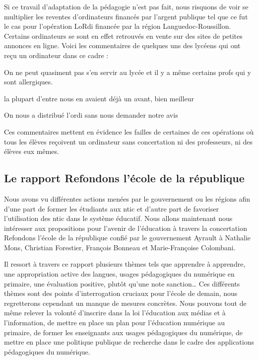 Si ce travail d'adaptation de la pédagogie n'est pas fait, nous
risquons de voir se multiplier les reventes d'ordinateurs financés par
l'argent publique tel que ce fut le cas pour l'opération \og{}LoRdi\fg{} financée par la région
Languedoc-Roussillon. Certains ordinateurs se sont en effet retrouvés en
vente sur des sites de petites annonces en ligne. Voici les
commentaires de quelques uns des lycéens qui ont reçu un ordinateur dans ce cadre :

\begin{coolquote}
  On ne peut quasiment pas s'en servir au lycée et il y a même certains profs qui y sont allergiques.
\end{coolquote}

\begin{coolquote}
  la plupart d’entre nous en avaient déjà un avant, bien meilleur
\end{coolquote}

\begin{coolquote}
  On nous a distribué l’ordi sans nous demander notre avis
\end{coolquote}

Ces commentaires mettent en évidence les failles de certaines de ces opérations où tous les élèves reçoivent un ordinateur sans concertation ni des professeurs, ni des élèves eux mêmes. 


\subsection{Le rapport \og{}Refondons l'école de la république\fg{}}

Nous avons vu différentes actions menées par le gouvernement ou les régions afin d'une part de former les étudiants aux \gls{ntic} et d'autre part de favoriser l'utilisation des \gls{ntic} dans le système éducatif. Nous allons maintenant nous intéresser aux propositions pour l'avenir de l'éducation à travers la concertation \og{}Refondons l'école de la république\fg{}\cite{rapport_ecole_2012} confié par le gouvernement Ayrault à Nathalie Mons, Christian Forestier, François Bonneau et Marie-Françoise Colombani. 

Il ressort à travers ce rapport plusieurs thèmes tels que \og{}apprendre à apprendre\fg{}, \og{}une appropriation active des langues\fg{}, \og{}usages pédagogiques du numérique en primaire\fg{}, \og{}une évaluation positive, plutôt qu'une note sanction\fg{}… Ces différents thèmes sont des points d'interrogation cruciaux pour l'école de demain, nous regretterons cependant un manque de mesures concrètes. Nous pouvons tout de même relever la volonté d'inscrire dans la loi \og l'éducation aux médias et à l'information\fg{}, de mettre en place un plan pour l'éducation numérique au primaire, de former les enseignants aux usages pédagogiques du numérique, de mettre en place une politique publique de recherche dans le cadre des applications pédagogiques du numérique.

